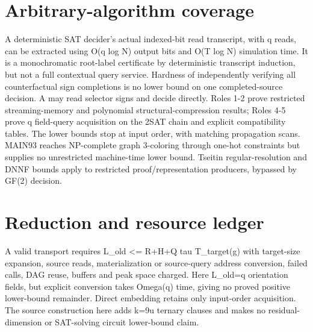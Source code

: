 \documentclass{article}
\begin{document}
\section{Arbitrary-algorithm coverage}
A deterministic SAT decider's actual indexed-bit read transcript, with q reads, can be extracted using O(q log N) output bits and O(T log N) simulation time. It is a monochromatic root-label certificate by deterministic transcript induction, but not a full contextual query service. Hardness of independently verifying all counterfactual sign completions is no lower bound on one completed-source decision. A may read selector signs and decide directly. Roles 1-2 prove restricted streaming-memory and polynomial structural-compression results; Roles 4-5 prove q field-query acquisition on the 2SAT chain and explicit compatibility tables. The lower bounds stop at input order, with matching propagation scans. MAIN93 reaches NP-complete graph 3-coloring through one-hot constraints but supplies no unrestricted machine-time lower bound. Tseitin regular-resolution and DNNF bounds apply to restricted proof/representation producers, bypassed by GF(2) decision.
\section{Reduction and resource ledger}
A valid transport requires L_old <= R+H+Q tau T_target(g) with target-size expansion, source reads, materialization or source-query address conversion, failed calls, DAG reuse, buffers and peak space charged. Here L_old=q orientation fields, but explicit conversion takes Omega(q) time, giving no proved positive lower-bound remainder. Direct embedding retains only input-order acquisition. The source construction here adds k=9u ternary clauses and makes no residual-dimension or SAT-solving circuit lower-bound claim.
\end{document}
